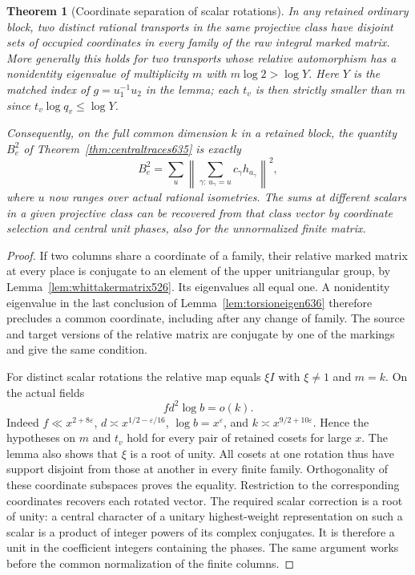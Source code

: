 \documentclass[a4paper,11pt]{article}
\newtheorem{theorem}[proposition]{Theorem}
\theoremstyle{definition}
\theoremstyle{remark}
\numberwithin{equation}{section}
\begin{document}
\begin{theorem}[Coordinate separation of scalar rotations]
\leavevmode\label{thm:scalarseparate636}
In any retained ordinary block, two distinct rational transports
in the same projective class have disjoint sets of occupied
coordinates in every family of the raw integral marked matrix.
More generally this holds for two transports whose relative
automorphism has a nonidentity eigenvalue of multiplicity \(m\)
with \(m\log2>\log Y\). Here \(Y\) is the matched index of
\(g=u_1^{-1}u_2\) in the lemma; each \(t_v\) is then strictly
smaller than \(m\) since \(t_v\log q_v\le\log Y\).

Consequently, on the full common dimension \(k\) in a retained block,
the quantity \(B_e^2\) of Theorem~\ref{thm:centraltraces635} is
exactly
\[
        B_e^2=\sum_{u}
             \left\|\sum_{\gamma:\,u_\gamma=u}
                                  c_\gamma h_{a_\gamma}\right\|^2 ,
\]
where \(u\) now ranges over actual rational isometries. The sums
at different scalars in a given projective class can be recovered
from that class vector by coordinate selection and central unit
phases, also for the unnormalized finite matrix.
\end{theorem}
\begin{proof}
If two columns share a coordinate of a family, their relative
marked matrix at every place is conjugate to an element of the
upper unitriangular group, by Lemma~\ref{lem:whittakermatrix526}.
Its eigenvalues all equal one. A nonidentity eigenvalue in the
last conclusion of Lemma~\ref{lem:torsioneigen636} therefore
precludes a common coordinate, including after any change of
family. The source and target versions of the relative matrix
are conjugate by one of the markings and give the same condition.

For distinct scalar rotations the relative map equals \(\xi I\)
with \(\xi\ne1\) and \(m=k\). On the actual fields
\[
             f d^2\log b=o(k).
\]
Indeed \(f\ll x^{2+8\varepsilon}\),
\(d\asymp x^{1/2-\varepsilon/16}\), \(\log b=x^\varepsilon\),
and \(k\asymp x^{9/2+10\varepsilon}\). Hence the hypotheses on
\(m\) and \(t_v\) hold for every pair of retained cosets for large
\(x\). The lemma also shows that \(\xi\) is a root of unity.
All cosets at one rotation thus have support disjoint from those
at another in every finite family. Orthogonality of these coordinate
subspaces proves the equality. Restriction to the corresponding
coordinates recovers each rotated vector. The required scalar
correction is a root of unity: a central character of a unitary
highest-weight representation on such a scalar is a product of
integer powers of its complex conjugates. It is therefore a unit
in the coefficient integers containing the phases. The same argument
works before the common normalization of the finite columns.
\end{proof}
\end{document}
